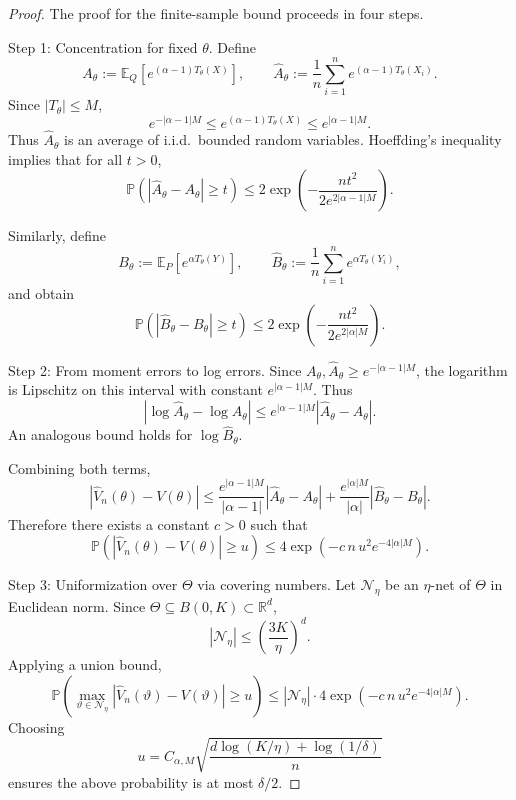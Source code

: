 \documentclass[10pt,a4paper]{amsart}
\providecommand{\paragraph}{}
\begin{document}
\begin{proof}
The proof for the finite-sample bound proceeds in four steps.

\paragraph{Step 1: Concentration for fixed $\theta$.}
Define
\[
A_\theta := \mathbb{E}_{Q}[e^{(\alpha-1)T_\theta(X)}],
\qquad
\widehat A_\theta := \frac{1}{n}\sum_{i=1}^n e^{(\alpha-1)T_\theta(X_i)}.
\]
Since $|T_\theta|\le M$,
\[
e^{-|\alpha-1|M} \le e^{(\alpha-1)T_\theta(X)} \le e^{|\alpha-1|M}.
\]
Thus $\widehat A_\theta$ is an average of i.i.d.\ bounded random variables.
Hoeffding's inequality implies that for all $t>0$,
\[
\mathbb{P}\left(|\widehat A_\theta-A_\theta|\ge t\right)
\le
2\exp\left(-\frac{n t^2}{2e^{2|\alpha-1|M}}\right).
\]

Similarly, define
\[
B_\theta := \mathbb{E}_{P}[e^{\alpha T_\theta(Y)}],
\qquad
\widehat B_\theta := \frac{1}{n}\sum_{i=1}^n e^{\alpha T_\theta(Y_i)},
\]
and obtain
\[
\mathbb{P}\left(|\widehat B_\theta-B_\theta|\ge t\right)
\le
2\exp\left(-\frac{n t^2}{2e^{2|\alpha|M}}\right).
\]

\paragraph{Step 2: From moment errors to log errors.}
Since $A_\theta,\widehat A_\theta \ge e^{-|\alpha-1|M}$,
the logarithm is Lipschitz on this interval with constant $e^{|\alpha-1|M}$.
Thus
\[
|\log \widehat A_\theta-\log A_\theta|
\le
e^{|\alpha-1|M}|\widehat A_\theta-A_\theta|.
\]
An analogous bound holds for $\log \widehat B_\theta$.

Combining both terms,
\[
|\widehat V_n(\theta)-V(\theta)|
\le
\frac{e^{|\alpha-1|M}}{|\alpha-1|}|\widehat A_\theta-A_\theta|
+
\frac{e^{|\alpha|M}}{|\alpha|}|\widehat B_\theta-B_\theta|.
\]
Therefore there exists a constant $c>0$ such that
\[
\mathbb{P}\left(|\widehat V_n(\theta)-V(\theta)|\ge u\right)
\le
4\exp\left(-c\,n\,u^2 e^{-4|\alpha|M}\right).
\]

\paragraph{Step 3: Uniformization over $\Theta$ via covering numbers.}
Let $\mathcal{N}_\eta$ be an $\eta$-net of $\Theta$ in Euclidean norm.
Since $\Theta\subseteq B(0,K)\subset\mathbb{R}^d$,
\[
|\mathcal{N}_\eta| \le \left(\frac{3K}{\eta}\right)^d.
\]
Applying a union bound,
\[
\mathbb{P}\left(
\max_{\vartheta\in\mathcal{N}_\eta}
|\widehat V_n(\vartheta)-V(\vartheta)|
\ge u
\right)
\le
|\mathcal{N}_\eta|\cdot
4\exp\left(-c\,n\,u^2 e^{-4|\alpha|M}\right).
\]
Choosing
\[
u
=
C_{\alpha,M}
\sqrt{\frac{d\log(K/\eta)+\log(1/\delta)}{n}}
\]
ensures the above probability is at most $\delta/2$.


\end{proof}
\end{document}
